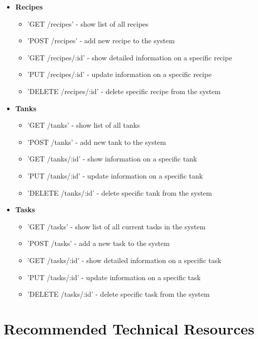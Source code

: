 \documentclass[draftclsnofoot,onecolumn,letterpaper,10pt]{IEEEtran}
\begin{document}
\begin{itemize}
		\item \textbf{Recipes}
			\begin{itemize}
				\item 'GET /recipes' - show list of all recipes
				\item 'POST /recipes' - add new recipe to the system
				\item 'GET /recipes/:id' - show detailed information on a specific recipe
				\item 'PUT /recipes/:id' - update information on a specific recipe
				\item 'DELETE /recipes/:id' - delete specific recipe from the system
			\end{itemize}

		\item \textbf{Tanks}
			\begin{itemize}
				\item 'GET /tanks' - show list of all tanks
				\item 'POST /tanks' - add new tank to the system
				\item 'GET /tanks/:id' - show information on a specific tank
				\item 'PUT /tanks/:id' - update information on a specific tank
				\item 'DELETE /tanks/:id' - delete specific tank from the system
			\end{itemize}

		\item \textbf{Tasks}
			\begin{itemize}
				\item 'GET /tasks' - show list of all current tasks in the system
				\item 'POST /tasks' - add a new task to the system
				\item 'GET /tasks/:id' - show detailed information on a specific task
				\item 'PUT /tasks/:id' - update information on a specific task
				\item 'DELETE /tasks/:id' - delete specific task from the system
			\end{itemize}
	\end{itemize}

\section{Recommended Technical Resources}
\end{document}
